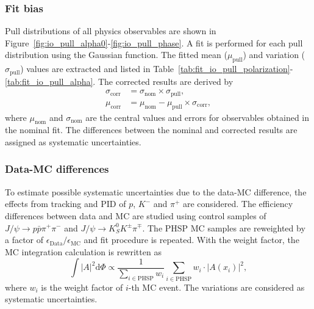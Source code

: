\subsubsection{Fit bias}
Pull distributions of all physics observables are shown in Figure~\ref{fig:io_pull_alpha0}-\ref{fig:io_pull_phase}. A fit is performed for each pull distribution using the Gaussian function. The fitted mean ($\mu_\mathrm{pull}$) and variation ($\sigma_{\mathrm{pull}}$) values are extracted and listed in Table~\ref{tab:fit_io_pull_polarization}-\ref{tab:fit_io_pull_alpha}. The corrected results are derived by
\begin{equation}
    \label{eq:IO_corr}
    \begin{split}
        \sigma_\mathrm{corr} &= \sigma_\mathrm{nom} \times \sigma_\mathrm{pull}, \\
        \mu_\mathrm{corr}    &= \mu_\mathrm{nom} - \mu_\mathrm{pull} \times \sigma_\mathrm{corr},
    \end{split}
\end{equation}
where $\mu_\mathrm{nom}$ and $\sigma_\mathrm{nom}$ are the central values and errors for observables obtained in the nominal fit. The differences between the nominal and corrected results are assigned as systematic uncertainties. 

\subsubsection{Data-MC differences}
To estimate possible systematic uncertainties due to the data-MC difference, the effects from tracking and PID of $p$, $K^-$ and $\pi^+$ are considered. The efficiency differences between data and MC are studied using control samples of $J/\psi \to p\bar{p}\pi^+\pi^-$ and $J/\psi \to K_S^0K^{\pm}\pi^{\mp}$. The PHSP MC samples are reweighted by a factor of $\epsilon_\mathrm{Data}/\epsilon_\mathrm{MC}$ and fit procedure is repeated. With the weight factor, the MC integration calculation is rewritten as
\begin{equation}\label{eq:mc_weight_integration}
    \int|A|^2\mathrm{d}\Phi \varpropto \frac{1}{\sum_{i\in\mathrm{PHSP}}w_i}\sum_{i \in \mathrm{{PHSP}}} w_i \cdot |A(x_i)|^2,
\end{equation}
where $w_i$ is the weight factor of $i$-th MC event. The variations are considered as systematic uncertainties.

